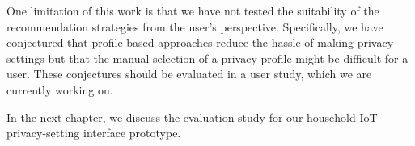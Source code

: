 One limitation of this work is that we have not tested the suitability of the recommendation strategies from the user's perspective. Specifically, we have conjectured that profile-based approaches reduce the hassle of making privacy settings but that the manual selection of a privacy profile might be difficult for a user. These conjectures should be evaluated in a user study, which we are currently working on.

In the next chapter, we discuss the evaluation study for our household IoT privacy-setting interface prototype.
